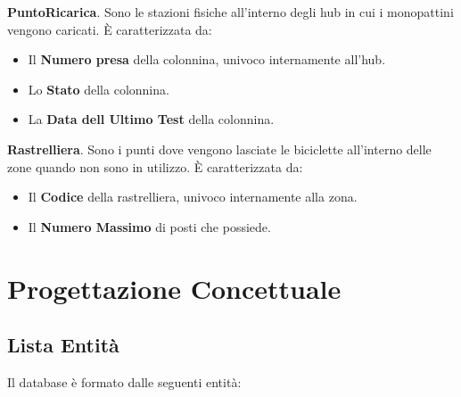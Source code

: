 \documentclass[11pt,a4paper]{article}
\begin{document}
\textbf{PuntoRicarica}. Sono le stazioni fisiche all'interno degli hub in cui i monopattini vengono caricati.
È caratterizzata da:
\begin{itemize}
    \item Il \textbf{Numero presa} della colonnina, univoco internamente all'hub.
    \item Lo \textbf{Stato} della colonnina.
    \item La \textbf{Data dell Ultimo Test} della colonnina.
\end{itemize}

\textbf{Rastrelliera}. Sono i punti dove vengono lasciate le biciclette all'interno delle zone quando non sono in utilizzo.
È caratterizzata da:
\begin{itemize}
    \item Il \textbf{Codice} della rastrelliera, univoco internamente alla zona.
    \item Il \textbf{Numero Massimo} di posti che possiede.
\end{itemize}
\newpage


\section{Progettazione Concettuale}
\subsection{Lista Entità}
Il database è formato dalle seguenti entità:
\end{document}
